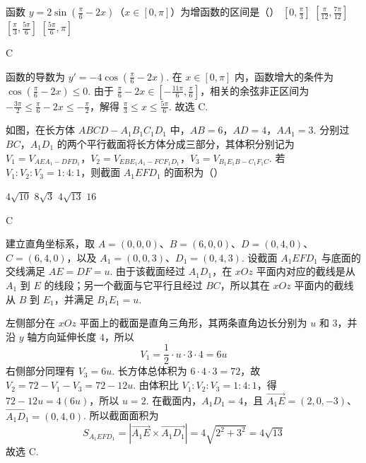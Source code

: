 \begin{problem}
函数 \(y = 2\sin \left(\frac{\pi}{6} - 2x\right)\)（\(x \in [0, \pi]\)）为增函数的区间是（\quad）
\choices
    {\(\left[0, \frac{\pi}{3}\right]\)}
    {\(\left[\frac{\pi}{12}, \frac{7\pi}{12}\right]\)}
    {\(\left[\frac{\pi}{3}, \frac{5\pi}{6}\right]\)}
    {\(\left[\frac{5\pi}{6}, \pi\right]\)}
\end{problem}

\begin{answer}
C
\end{answer}

\begin{solution}
函数的导数为
 \(y'=-4\cos\left(\frac{\pi}{6}-2x\right)\). 在 \(x\in[0,\pi]\) 内，函数增大的条件为 \(\cos\left(\frac{\pi}{6}-2x\right)\leqslant0\). 由于 \(\frac{\pi}{6}-2x\in[-\frac{11\pi}{6},\frac{\pi}{6}]\)，相关的余弦非正区间为 \(-\frac{3\pi}{2}\leqslant\frac{\pi}{6}-2x\leqslant-\frac{\pi}{2}\)，解得 \(\frac{\pi}{3}\leqslant x\leqslant\frac{5\pi}{6}\).
故选 C.
\end{solution}

\begin{problem}
如图，在长方体 \(ABCD - A_{1}B_{1}C_{1}D_{1}\) 中，\(AB = 6\)，\(AD = 4\)，\(AA_{1} = 3\). 分别过 \(BC\)，\(A_{1}D_{1}\) 的两个平行截面将长方体分成三部分，其体积分别记为 \(V_{1} = V_{AEA_{1}-DFD_{1}}\)，\(V_{2} = V_{EBE_{1}A_{1}-FCF_{1}D_{1}}\)，\(V_{3} = V_{B_{1}E_{1}B-C_{1}F_{1}C}\). 若 \(V_{1}: V_{2}: V_{3} = 1: 4: 1\)，则截面 \(A_{1}EFD_{1}\) 的面积为（\quad）


\choices
    {\(4\sqrt{10}\)}
    {\(8\sqrt{3}\)}
    {\(4\sqrt{13}\)}
    {\(16\)}
\end{problem}

\begin{answer}
C
\end{answer}

\begin{solution}
建立直角坐标系，取
\(A=(0,0,0)\)、\(B=(6,0,0)\)、\(D=(0,4,0)\)、\(C=(6,4,0)\)，以及 \(A_1=(0,0,3)\)、\(D_1=(0,4,3)\). 设截面 \(A_1EFD_1\) 与底面的交线满足 \(AE=DF=u\). 由于该截面经过 \(A_1D_1\)，在 \(xOz\) 平面内对应的截线是从 \(A_1\) 到 \(E\) 的线段；另一个截面与它平行且经过 \(BC\)，所以其在 \(xOz\) 平面内的截线从 \(B\) 到 \(E_1\)，并满足 \(B_1E_1=u\).

左侧部分在 \(xOz\) 平面上的截面是直角三角形，其两条直角边长分别为 \(u\) 和 \(3\)，并沿 \(y\) 轴方向延伸长度 \(4\)，所以
\[
V_1=\frac12\cdot u\cdot3\cdot4=6u
\]
右侧部分同理有 \(V_3=6u\). 长方体总体积为 \(6\cdot4\cdot3=72\)，故 \(V_2=72-V_1-V_3=72-12u\). 由体积比 \(V_1:V_2:V_3=1:4:1\)，得 \(72-12u=4(6u)\)，所以 \(u=2\).
在截面内，\(A_1D_1=4\)，且 \(\overrightarrow{A_1E}=(2,0,-3)\)、\(\overrightarrow{A_1D_1}=(0,4,0)\).
所以截面面积为
\[
S_{A_1EFD_1}=|\overrightarrow{A_1E}\times\overrightarrow{A_1D_1}|
=4\sqrt{2^2+3^2}=4\sqrt{13}
\]
故选 C.
\end{solution}

